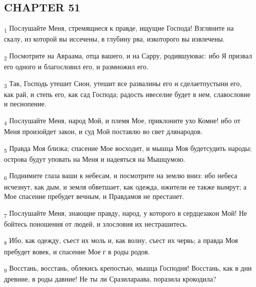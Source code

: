 \subsection{CHAPTER 51}
\begin{tcolorbox}
\textsubscript{1} Послушайте Меня, стремящиеся к правде, ищущие Господа! Взгляните на скалу, из которой вы иссечены, в глубину рва, изкоторого вы извлечены.
\end{tcolorbox}
\begin{tcolorbox}
\textsubscript{2} Посмотрите на Авраама, отца вашего, и на Сарру, родившуювас: ибо Я призвал его одного и благословил его, и размножил его.
\end{tcolorbox}
\begin{tcolorbox}
\textsubscript{3} Так, Господь утешит Сион, утешит все развалины его и сделаетпустыни его, как рай, и степь его, как сад Господа; радость ивеселие будет в нем, славословие и песнопение.
\end{tcolorbox}
\begin{tcolorbox}
\textsubscript{4} Послушайте Меня, народ Мой, и племя Мое, приклоните ухо Комне! ибо от Меня произойдет закон, и суд Мой поставлю во свет длянародов.
\end{tcolorbox}
\begin{tcolorbox}
\textsubscript{5} Правда Моя близка; спасение Мое восходит, и мышца Моя будетсудить народы; острова будут уповать на Меня и надеяться на Мышцумою.
\end{tcolorbox}
\begin{tcolorbox}
\textsubscript{6} Поднимите глаза ваши к небесам, и посмотрите на землю вниз: ибо небеса исчезнут, как дым, и земля обветшает, как одежда, ижители ее также вымрут; а Мое спасение пребудет вечным, и Правдамоя не престанет.
\end{tcolorbox}
\begin{tcolorbox}
\textsubscript{7} Послушайте Меня, знающие правду, народ, у которого в сердцезакон Мой! Не бойтесь поношения от людей, и злословия их нестрашитесь.
\end{tcolorbox}
\begin{tcolorbox}
\textsubscript{8} Ибо, как одежду, съест их моль и, как волну, съест их червь; а правда Моя пребудет вовек, и спасение Мое г в роды родов.
\end{tcolorbox}
\begin{tcolorbox}
\textsubscript{9} Восстань, восстань, облекись крепостью, мышца Господня! Восстань, как в дни древние, в роды давние! Не ты ли Сразилараава, поразила крокодила?
\end{tcolorbox}
